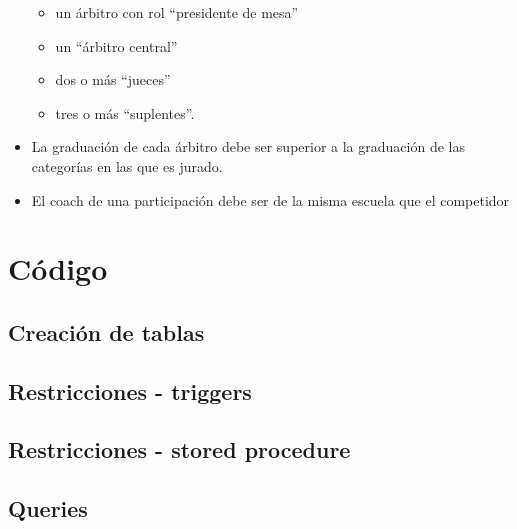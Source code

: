 \documentclass[a4paper]{article}
\begin{document}
\begin{itemize}
\begin{itemize}

\item un árbitro con rol “presidente de mesa”

\item un “árbitro central”

\item dos o más “jueces”

\item tres o más “suplentes”.

\end{itemize}

\item La graduación de cada árbitro debe ser superior a la graduación de las categorías en las que es jurado. 

\item El coach de una participación debe ser de la misma escuela que el competidor

\end{itemize}

\section{Código}

\subsection{Creación de tablas}



\subsection{Restricciones - triggers}



\subsection{Restricciones - stored procedure}



\subsection{Queries}


\end{document}
